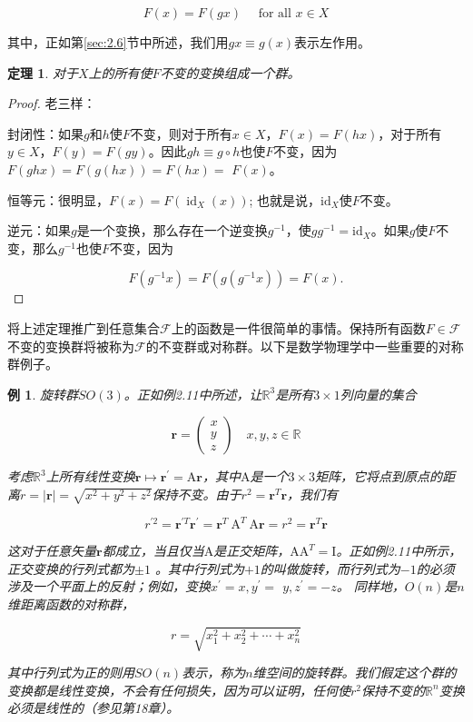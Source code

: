 \documentclass[hyperref,UTF8]{ctexbook}
\newtheorem{eg}{例}[chapter]
\newtheorem{theorem}{定理}[chapter]
\begin{document}
$$
F(x)=F(g x) \quad \text { for all } x \in X
$$

其中，正如第\ref{sec:2.6}节中所述，我们用$g x \equiv g(x)$表示左作用。
\begin{theorem}
    对于$X$上的所有使$F$不变的变换组成一个群。
\end{theorem}
\begin{proof}
    老三样：

封闭性：如果$g$和$h$使$F$不变，则对于所有$x \in X$，$F(x)=F(h x)$，对于所有$y \in X$，$F(y)=F(g y)$。因此$g h \equiv g \circ h$也使$F$不变，因为$F(g h x)=F(g(h x))=F(h x)=$ $F(x)$。

恒等元：很明显，$F(x)=F\left(\operatorname{id}_{X}(x)\right)$; 也就是说，$\mathrm{id}_{X}$使$F$不变。

逆元：如果$g$是一个变换，那么存在一个逆变换$g^{-1}$，使$g g^{-1}=\mathrm{id}_{X}$。如果$g$使$F$不变，那么$g^{-1}$也使$F$不变，因为

$$
F\left(g^{-1} x\right)=F\left(g\left(g^{-1} x\right)\right)=F(x) .
$$
\end{proof}
将上述定理推广到任意集合$\mathcal{F}$上的函数是一件很简单的事情。保持所有函数$F \in \mathcal{F}$不变的变换群将被称为$\mathcal{F}$的不变群或对称群。以下是数学物理学中一些重要的对称群例子。
\begin{eg}
    旋转群$SO(3)$。正如例2.11中所述，让$\mathbb{R}^3$是所有$3 \times 1$列向量的集合

$$
\mathbf{r}=\left(\begin{array}{l}
x \\
y \\
z
\end{array}\right) \quad  x, y, z \in \mathbb{R}
$$

考虑$\mathbb{R}^3$上所有线性变换$\mathbf{r} \mapsto \mathbf{r}^{\prime}=\mathrm{A} \mathbf{r}$，其中$\mathrm{A}$是一个$3 \times 3$矩阵，它将点到原点的距离$r=|\mathbf{r}|=\sqrt{x^{2}+y^{2}+z^{2}}$保持不变。由于$r^2=\mathbf{r}^T \mathbf{r}$，我们有

$$
r^{\prime 2}=\mathbf{r}^{\prime T} \mathbf{r}^{\prime}=\mathbf{r}^{T} \mathrm{~A}^{T} \mathrm{~A} \mathbf{r}=r^{2}=\mathbf{r}^{T} \mathbf{r}
$$

这对于任意矢量$\mathbf{r}$都成立，当且仅当$\mathrm{A}$是正交矩阵，$\mathrm{AA}^{T}=\mathrm{I}$。正如例2.11中所示，正交变换的行列式都为$\pm 1$ 。其中行列式为$+1$的叫做旋转，而行列式为$-1$的必须涉及一个平面上的反射；例如，变换$x^{\prime}=x, y^{\prime}=$ $y, z^{\prime}=-z$。
同样地，$O(n)$是$n$维距离函数的对称群，

$$
r=\sqrt{x_{1}^{2}+x_{2}^{2}+\cdots+x_{n}^{2}}
$$

其中行列式为正的则用$S O(n)$表示，称为$n$维空间的旋转群。我们假定这个群的变换都是线性变换，不会有任何损失，因为可以证明，任何使$r^{2}$保持不变的$\mathbb{R}^{n}$变换必须是线性的（参见第18章）。
\end{eg}
\end{document}

